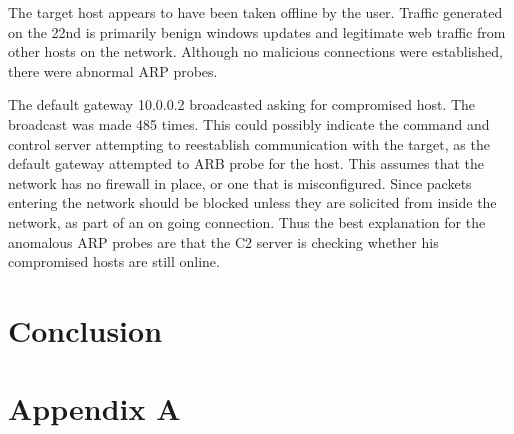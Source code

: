 \documentclass[11pt]{diazessay} %
\begin{document}
The target host appears to have been taken offline by the user. Traffic generated on the 22nd is primarily benign windows updates and legitimate web traffic from other hosts on the network. Although no malicious connections were established, there were abnormal ARP probes.

The default gateway 10.0.0.2 broadcasted asking for compromised host. The broadcast was made 485 times. This could possibly indicate the command and control server attempting to reestablish communication with the target, as the default gateway attempted to ARB probe for the host. This assumes that the network has no firewall in place, or one that is misconfigured. Since packets entering the network should be blocked unless they are solicited from inside the network, as part of an on going connection. Thus the best explanation for the anomalous ARP probes are that the C2 server is checking whether his compromised hosts are still online.


\section*{Conclusion}


\clearpage
%



\section*{Appendix A}


\end{document}
